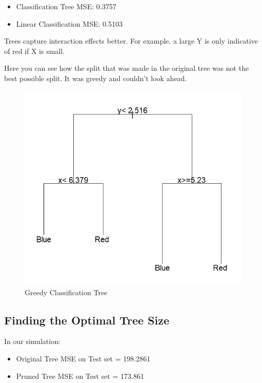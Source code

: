 \documentclass[12pt]{article}
\begin{document}
\begin{itemize}
    \item Classification Tree MSE: 0.3757
    \item Linear Classification MSE: 0.5103
\end{itemize}

Trees capture interaction effects better. For example, a large Y is only indicative of red if X is small.




Here you can see how the split that was made in the original tree was not the best possible split. It was greedy and couldn't look ahead.



\begin{figure}
    \centering
    \includegraphics[width=1\linewidth]{Greedy Classification Tree.png}
    \caption{Greedy Classification Tree}
    \label{fig:sub7}  %
\end{figure}%


\subsection{Finding the Optimal Tree Size}
In our simulation:
\begin{itemize}
    \item Original Tree MSE on Test set = 198.2861 
    \item Pruned Tree MSE on Test set = 173.861 
\end{itemize}
\end{document}

